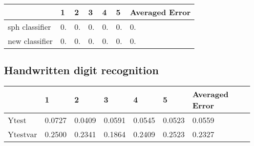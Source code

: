 \documentclass[a4paper,11pt]{article}
\begin{document}
\\
\begin{tabular}{|l|l|l|l|l|l|l|}
	\hline
	& 1 & 2 &  3 & 4 & 5 & Averaged Error \\ \hline
	sph classifier & 0.  & 0.    & 0.   & 0.   & 0.  & 0.          \\ \hline
	new classifier & 0.  & 0.  & 0.   & 0.   & 0.  & 0.  \\ \hline
\end{tabular}

\subsection{Handwritten digit recognition}
\begin{tabular}{|l|l|l|l|l|l|l|}
	\hline
	& 1 & 2 &  3 & 4 & 5 & Averaged Error \\ \hline
	Ytest & 0.0727  & 0.0409    & 0.0591   & 0.0545   & 0.0523  & 0.0559          \\ \hline
	Ytestvar & 0.2500  & 0.2341  & 0.1864   & 0.2409   & 0.2523  & 0.2327          \\ \hline
\end{tabular}
\end{document}
